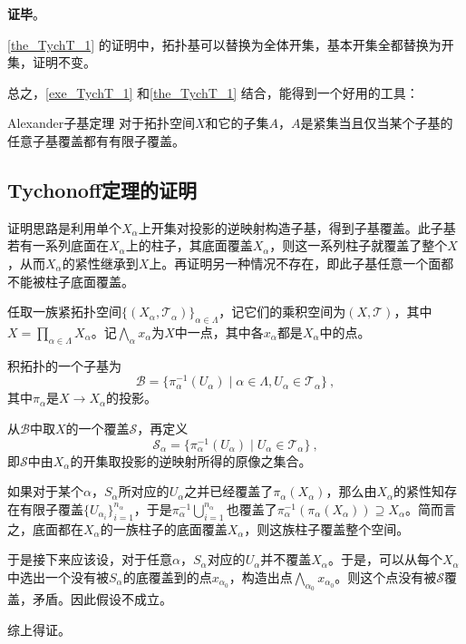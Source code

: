\textbf{证毕}。



\autoref{the_TychT_1} 的证明中，拓扑基可以替换为全体开集，基本开集全都替换为开集，证明不变。

总之，\autoref{exe_TychT_1} 和\autoref{the_TychT_1} 结合，能得到一个好用的工具：

\begin{corollary}{Alexander子基定理}
对于拓扑空间$X$和它的子集$A$，$A$是紧集当且仅当某个子基的任意子基覆盖都有有限子覆盖。
\end{corollary}




\subsection{Tychonoff定理的证明}

证明思路是利用单个$X_\alpha$上开集对投影的逆映射构造子基，得到子基覆盖。此子基若有一系列底面在$X_\alpha$上的柱子，其底面覆盖$X_\alpha$，则这一系列柱子就覆盖了整个$X$，从而$X_\alpha$的紧性继承到$X$上。再证明另一种情况不存在，即此子基任意一个面都不能被柱子底面覆盖。

任取一族紧拓扑空间$\{(X_\alpha, \mathcal{T}_\alpha)\}_{\alpha\in \Lambda}$，记它们的乘积空间为$(X, \mathcal{T})$，其中$X=\prod_{\alpha\in\Lambda}X_\alpha$。记$\bigwedge_\alpha x_\alpha$为$X$中一点，其中各$x_\alpha$都是$X_\alpha$中的点。

积拓扑的一个子基为
\begin{equation}
\mathcal{B} = \{\pi_\alpha^{-1}(U_\alpha)\mid \alpha\in\Lambda, U_\alpha\in \mathcal{T}_\alpha\}~,
\end{equation}
其中$\pi_\alpha$是$X\to X_\alpha$的投影。

从$\mathcal{B}$中取$X$的一个覆盖$\mathcal{S}$，再定义
\begin{equation}
\mathcal{S}_\alpha = \{\pi_\alpha^{-1}(U_\alpha)\mid U_\alpha\in \mathcal{T}_\alpha\}~,
\end{equation}
即$\mathcal{S}$中由$X_\alpha$的开集取投影的逆映射所得的原像之集合。

如果对于某个$\alpha$，$S_\alpha$所对应的$U_\alpha$之并已经覆盖了$\pi_\alpha(X_\alpha)$，那么由$X_\alpha$的紧性知存在有限子覆盖$\{U_{\alpha_i}\}_{i=1}^{n_\alpha}$，于是$\pi_\alpha^{-1}\bigcup_{i=1}^{n_\alpha}$也覆盖了$\pi_\alpha^{-1}(\pi_\alpha(X_\alpha))\supseteq X_\alpha$。简而言之，底面都在$X_\alpha$的一族柱子的底面覆盖$X_\alpha$，则这族柱子覆盖整个空间。

于是接下来应该设，对于任意$\alpha$，$S_\alpha$对应的$U_\alpha$并不覆盖$X_\alpha$。于是，可以从每个$X_\alpha$中选出一个没有被$S_\alpha$的底覆盖到的点$x_{\alpha_0}$，构造出点$\bigwedge_{\alpha_0}x_{\alpha_0}$。则这个点没有被$\mathcal{S}$覆盖，矛盾。因此假设不成立。

综上得证。


















